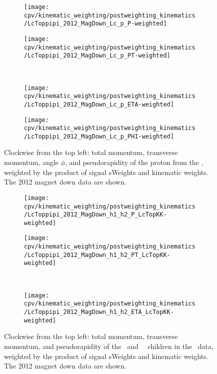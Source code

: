 \begin{figure}
  \begin{subfigure}[b]{0.4\textwidth}
    \texttt{[image: cpv/kinematic\_weighting/postweighting\_kinematics/LcToppipi\_2012\_MagDown\_Lc\_p\_P-weighted]}
    \label{fig:cpv:kinematic_weighting:post:Lc_p:P}
  \end{subfigure}
  \begin{subfigure}[b]{0.4\textwidth}
    \texttt{[image: cpv/kinematic\_weighting/postweighting\_kinematics/LcToppipi\_2012\_MagDown\_Lc\_p\_PT-weighted]}
    \label{fig:cpv:kinematic_weighting:post:Lc_p:PT}
  \end{subfigure}\\
  \begin{subfigure}[b]{0.4\textwidth}
    \texttt{[image: cpv/kinematic\_weighting/postweighting\_kinematics/LcToppipi\_2012\_MagDown\_Lc\_p\_ETA-weighted]}
    \label{fig:cpv:kinematic_weighting:post:Lc_p:ETA}
  \end{subfigure}
  \begin{subfigure}[b]{0.4\textwidth}
    \texttt{[image: cpv/kinematic\_weighting/postweighting\_kinematics/LcToppipi\_2012\_MagDown\_Lc\_p\_PHI-weighted]}
    \label{fig:cpv:kinematic_weighting:post:Lc_p:PHI}
  \end{subfigure}
  \caption{%
    Clockwise from the top left: total momentum, transverse momentum, angle
    $\phi$, and pseudorapidity of the proton from the \PLambdac, weighted by
    the product of signal sWeights and kinematic weights.
    The 2012 magnet down data are shown.
  }
  \label{fig:cpv:kinematic_weighting:post:Lc_p}
\end{figure}

\begin{figure}
  \begin{subfigure}[b]{0.5\textwidth}
    \centering
    \texttt{[image: cpv/kinematic\_weighting/postweighting\_kinematics/LcToppipi\_2012\_MagDown\_h1\_h2\_P\_LcTopKK-weighted]}
    \label{fig:cpv:kinematic_weighting:post:pKK_h1h2:P}
  \end{subfigure}
  \begin{subfigure}[b]{0.5\textwidth}
    \centering
    \texttt{[image: cpv/kinematic\_weighting/postweighting\_kinematics/LcToppipi\_2012\_MagDown\_h1\_h2\_PT\_LcTopKK-weighted]}
    \label{fig:cpv:kinematic_weighting:post:pKK_h1h2:PT}
  \end{subfigure}\\
  \begin{subfigure}[b]{\textwidth}
    \centering
    \texttt{[image: cpv/kinematic\_weighting/postweighting\_kinematics/LcToppipi\_2012\_MagDown\_h1\_h2\_ETA\_LcTopKK-weighted]}
    \label{fig:cpv:kinematic_weighting:post:pKK_h1h2:ETA}
  \end{subfigure}
  \caption{%
    Clockwise from the top left: total momentum, transverse momentum, and
    pseudorapidity of the \PKminus\ and \PKplus\ \PLambdac\ children in the
    \pKK\ data, weighted by the product of signal sWeights and kinematic
    weights.
    The 2012 magnet down data are shown.
  }
  \label{fig:cpv:kinematic_weighting:post:pKK_h1h2}
\end{figure}

